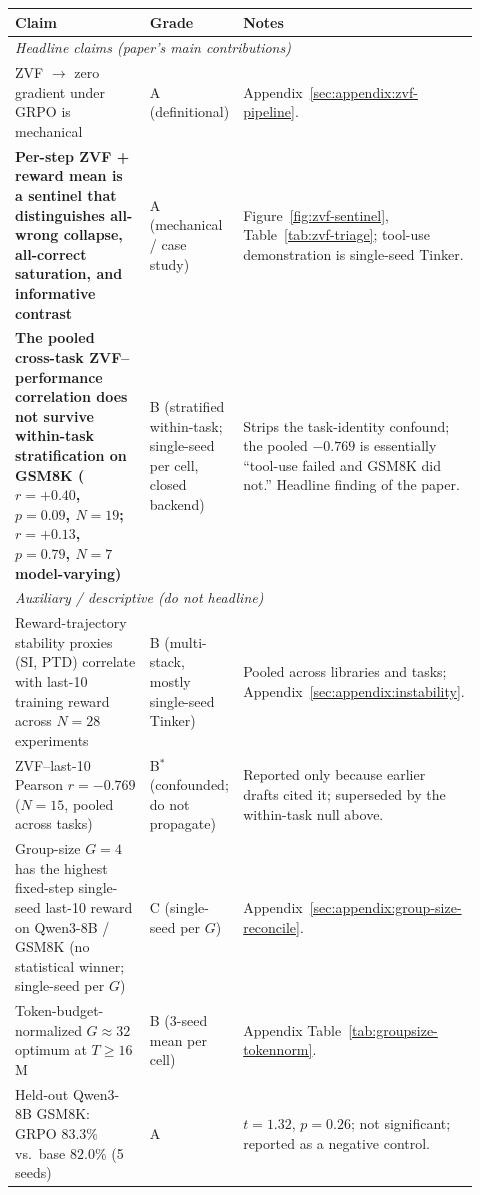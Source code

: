\documentclass{article}
\begin{document}
\begin{table}[htbp]
\centering\small
\setlength{\tabcolsep}{4pt}
\begin{tabular}{p{0.42\linewidth}p{0.18\linewidth}p{0.32\linewidth}}
\toprule
\textbf{Claim} & \textbf{Grade} & \textbf{Notes} \\
\midrule
\multicolumn{3}{l}{\textit{Headline claims (paper's main contributions)}} \\
\midrule
ZVF $\to$ zero gradient under GRPO is mechanical &
A (definitional) &
Appendix~\ref{sec:appendix:zvf-pipeline}. \\
\textbf{Per-step ZVF + reward mean is a sentinel that distinguishes
all-wrong collapse, all-correct saturation, and informative contrast} &
A (mechanical / case study) &
Figure~\ref{fig:zvf-sentinel}, Table~\ref{tab:zvf-triage}; tool-use
demonstration is single-seed Tinker. \\
\textbf{The pooled cross-task ZVF--performance correlation does not
survive within-task stratification on GSM8K
($r{=}+0.40$, $p{=}0.09$, $N{=}19$; $r{=}+0.13$, $p{=}0.79$, $N{=}7$
model-varying)} &
B (stratified within-task; single-seed per cell, closed backend) &
Strips the task-identity confound; the pooled $-0.769$ is essentially
``tool-use failed and GSM8K did not.'' Headline finding of the paper. \\
\midrule
\multicolumn{3}{l}{\textit{Auxiliary / descriptive (do not headline)}} \\
\midrule
Reward-trajectory stability proxies (SI, PTD) correlate with last-10
training reward across $N{=}28$ experiments &
B (multi-stack, mostly single-seed Tinker) &
Pooled across libraries and tasks; Appendix~\ref{sec:appendix:instability}. \\
ZVF--last-10 Pearson $r = -0.769$ ($N{=}15$, pooled across tasks) &
B$^{*}$ (confounded; do not propagate) &
Reported only because earlier drafts cited it; superseded by the
within-task null above. \\
Group-size $G{=}4$ has the highest fixed-step single-seed last-10 reward
on Qwen3-8B / GSM8K (no statistical winner; single-seed per $G$) &
C (single-seed per $G$) &
Appendix~\ref{sec:appendix:group-size-reconcile}. \\
Token-budget-normalized $G{\approx}32$ optimum at $T\!\ge\!16$M &
B (3-seed mean per cell) &
Appendix Table~\ref{tab:groupsize-tokennorm}. \\
Held-out Qwen3-8B GSM8K: GRPO $83.3\%$ vs.\ base $82.0\%$ (5 seeds) &
A &
$t{=}1.32$, $p{=}0.26$; not significant; reported as a negative control. \\

\end{tabular}
\end{table}
\end{document}
